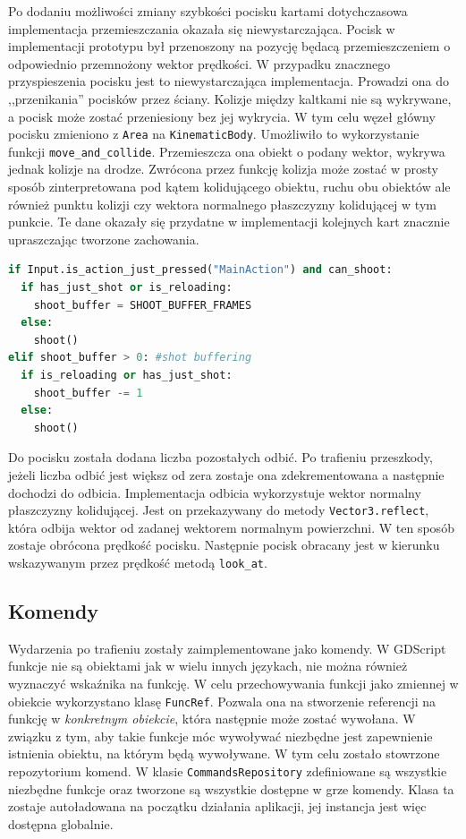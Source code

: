 Po dodaniu możliwości zmiany szybkości pocisku kartami dotychczasowa implementacja przemieszczania okazała się niewystarczająca. Pocisk w implementacji prototypu był przenoszony na pozycję będacą przemieszczeniem o odpowiednio przemnożony wektor prędkości. W przypadku znacznego przyspieszenia pocisku jest to niewystarczająca implementacja. Prowadzi ona do ,,przenikania'' pocisków przez ściany. Kolizje między kaltkami nie są wykrywane, a pocisk może zostać przeniesiony bez jej wykrycia. W tym celu węzeł główny pocisku zmieniono z \texttt{Area} na \texttt{KinematicBody}. Umożliwiło to wykorzystanie funkcji \texttt{move\_and\_collide}. Przemieszcza ona obiekt o podany wektor, wykrywa jednak kolizje na drodze. Zwrócona przez funkcję kolizja może zostać w prosty sposób zinterpretowana pod kątem kolidującego obiektu, ruchu obu obiektów ale również punktu kolizji czy wektora normalnego płaszczyzny kolidującej w tym punkcie. Te dane okazały się przydatne w implementacji kolejnych kart znacznie upraszczając tworzone zachowania.  

\begin{lstlisting}[language=python,caption=Implementacja decyzji o dokonaniu strzału., label=lst:shooting_impl,basicstyle=\footnotesize\ttfamily]
if Input.is_action_just_pressed("MainAction") and can_shoot:
  if has_just_shot or is_reloading:
    shoot_buffer = SHOOT_BUFFER_FRAMES
  else:
    shoot()
elif shoot_buffer > 0: #shot buffering
  if is_reloading or has_just_shot:
    shoot_buffer -= 1
  else:
    shoot()
\end{lstlisting}

Do pocisku została dodana liczba pozostałych odbić. Po trafieniu przeszkody, jeżeli liczba odbić jest większ od zera zostaje ona zdekrementowana a następnie dochodzi do odbicia. Implementacja odbicia wykorzystuje wektor normalny płaszczyzny kolidującej. Jest on przekazywany do metody \texttt{Vector3.reflect}, która odbija wektor od zadanej wektorem normalnym powierzchni. W ten sposób zostaje obrócona prędkość pocisku. Następnie pocisk obracany jest w kierunku wskazywanym przez prędkość metodą \texttt{look\_at}.

\subsection{Komendy}
Wydarzenia po trafieniu zostały zaimplementowane jako komendy. W GDScript funkcje nie są obiektami jak w wielu innych językach, nie można również wyznaczyć wskaźnika na funkcję. W celu przechowywania funkcji jako zmiennej w obiekcie wykorzystano klasę \texttt{FuncRef}. Pozwala ona na stworzenie referencji na funkcję w \emph{konkretnym obiekcie}, która następnie może zostać wywołana. W związku z tym, aby takie funkcje móc wywoływać niezbędne jest zapewnienie istnienia obiektu, na którym będą wywoływane. W tym celu zostało stowrzone repozytorium komend. W klasie \texttt{CommandsRepository} zdefiniowane są wszystkie niezbędne funkcje oraz tworzone są wszystkie dostępne w grze komendy. Klasa ta zostaje autoładowana na początku działania aplikacji, jej instancja jest więc dostępna globalnie.

